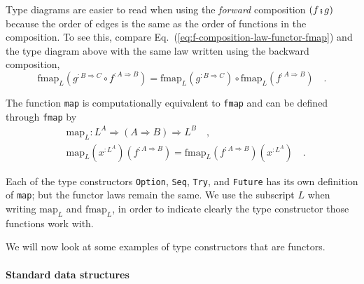 Type diagrams are easier to read when using the \emph{forward} composition
$\left(f\bef g\right)$ because the order of edges is the same as
the order of functions in the composition. To see this, compare Eq.~(\ref{eq:f-composition-law-functor-fmap})
and the type diagram above with the same law written using the backward
composition,
\[
\text{fmap}_{L}(g^{:B\Rightarrow C}\circ f^{:A\Rightarrow B})=\text{fmap}_{L}(g^{:B\Rightarrow C})\circ\text{fmap}_{L}(f^{:A\Rightarrow B})\quad.
\]

The function \lstinline!map! is computationally equivalent to \lstinline!fmap!
and can be defined through \lstinline!fmap! by
\begin{align*}
 & \text{map}_{L}:L^{A}\Rightarrow\left(A\Rightarrow B\right)\Rightarrow L^{B}\quad,\\
 & \text{map}_{L}(x^{:L^{A}})(f^{:A\Rightarrow B})=\text{fmap}_{L}(f^{:A\Rightarrow B})(x^{:L^{A}})\quad.
\end{align*}

Each of the type constructors \lstinline!Option!, \lstinline!Seq!,
\lstinline!Try!, and \lstinline!Future! has its own definition of
\lstinline!map!; but the functor laws remain the same. We use the
subscript $L$ when writing $\text{map}_{L}$ and $\text{fmap}_{L}$,
in order to indicate clearly the type constructor those functions
work with.

We will now look at some examples of type constructors that are functors.

\paragraph{Standard data structures}

